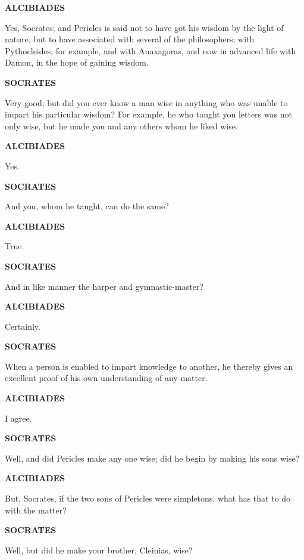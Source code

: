 \documentclass[11pt,letter]{article}
\begin{document}
\par \textbf{ALCIBIADES}
\par   Yes, Socrates; and Pericles is said not to have got his wisdom by the light of nature, but to have associated with several of the philosophers; with Pythocleides, for example, and with Anaxagoras, and now in advanced life with Damon, in the hope of gaining wisdom.

\par \textbf{SOCRATES}
\par   Very good; but did you ever know a man wise in anything who was unable to impart his particular wisdom? For example, he who taught you letters was not only wise, but he made you and any others whom he liked wise.

\par \textbf{ALCIBIADES}
\par   Yes.

\par \textbf{SOCRATES}
\par   And you, whom he taught, can do the same?

\par \textbf{ALCIBIADES}
\par   True.

\par \textbf{SOCRATES}
\par   And in like manner the harper and gymnastic-master?

\par \textbf{ALCIBIADES}
\par   Certainly.

\par \textbf{SOCRATES}
\par   When a person is enabled to impart knowledge to another, he thereby gives an excellent proof of his own understanding of any matter.

\par \textbf{ALCIBIADES}
\par   I agree.

\par \textbf{SOCRATES}
\par   Well, and did Pericles make any one wise; did he begin by making his sons wise?

\par \textbf{ALCIBIADES}
\par   But, Socrates, if the two sons of Pericles were simpletons, what has that to do with the matter?

\par \textbf{SOCRATES}
\par   Well, but did he make your brother, Cleinias, wise?
\end{document}
